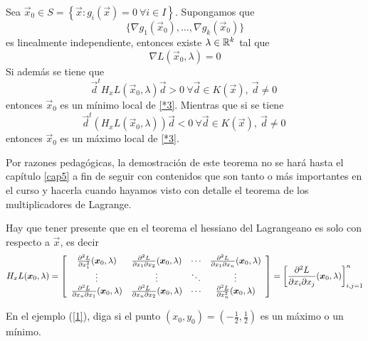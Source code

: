 \begin{teorema}\label{cso-lagrange}
Sea $\vec{x}_{0}\in S=\left\{\vec{x}: g_i(\vec{x})=0\:\forall i\in I\right\}  $. Supongamos que
$$\{\nabla g_1(\vec{x}_{0}),\ldots ,\nabla g_k(\vec{x}_{0})\}$$
es linealmente independiente, entonces existe $\lambda\in\mathbb{R}^{k}$ tal que%
\[
\nabla L(\vec{x}_{0},\lambda)=0
\]
Si adem\'as se tiene que%
\[
\vec{d}^tH_{x}L(\vec{x}_{0},\lambda)\vec{d}>0\:\forall \vec{d}\in K(\vec{x}),\:\vec{d}\neq
0\:
\]
entonces $\vec{x}_{0}$ es un m\'inimo local de \eqref{*3}. Mientras que si se tiene
\[
\vec{d}^t(H_{x}L(\vec{x}_{0},\lambda))\vec{d}<0\:\forall \vec{d}\in K(\vec{x}),\:\vec{d}\neq
0\:
\]
entonces $\vec{x}_0$ es un m\'aximo local de \eqref{*3}.
\end{teorema}

Por razones pedag\'ogicas, la demostraci\'on de este teorema no se har\'a hasta el cap\'itulo \ref{cap5} a fin de seguir con contenidos que son tanto o m\'as importantes en el curso y hacerla cuando hayamos visto con detalle el teorema de los multiplicadores de Lagrange.

Hay que tener presente que en el teorema el hessiano del Lagrangeano es solo con respecto
a $\vec{x}$, es decir
$$
H_{x}L(\vec{x}_{0},\lambda)  =\left[
\begin{array}
[c]{cccc}%
\frac{\partial^{2}L}{\partial x_{1}^{2}}(\vec{x}_{0},\lambda) & \frac{\partial^{2}%
L}{\partial x_{1}\partial x_{2}}(\vec{x}_{0},\lambda) & \cdots & \frac{\partial
^{2}L}{\partial x_{1}\partial x_{n}}(\vec{x}_{0},\lambda)\\
\vdots & \vdots & \ddots & \vdots\\
\frac{\partial^{2}L}{\partial x_{n}\partial x_{1}}(\vec{x}_{0},\lambda) &
\frac{\partial^{2}L}{\partial x_{n}\partial x_{2}}(\vec{x}_{0},\lambda) & \cdots &
\frac{\partial^{2}L}{\partial x_{n}^{2}}(\vec{x}_{0},\lambda)
\end{array}
\right] 
=\left[  \frac{\partial^{2}L}{\partial x_i\partial x_{j}}(\vec{x}_{0}%
,\lambda)\right]  _{i,j=1}^{n}%
$$

\begin{ejemplo}
En el ejemplo (\ref{1}), diga si el punto $(x_{0},y_{0})=(-\frac{1}{2}%
,\frac{1}{2})$ es un m\'aximo o un m\'inimo.
\end{ejemplo}

